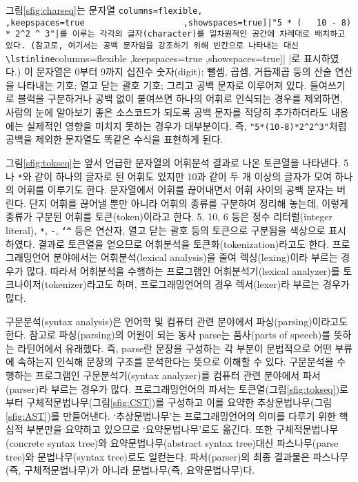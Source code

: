 그림\;\ref{sfig:charseq}는 문자열
\lstinline[columns=flexible,
                   ,keepspaces=true
                   ,showspaces=true]|"5 * (   10 - 8) * 2^2 ^ 3"|를
이루는 각각의 글자(character)를 일차원적인 공간에 차례대로 배치하고 있다.
(참고로, 여기서는 공백 문자임을 강조하기 위해 빈칸으로 나타내는 대신
\lstinline[columns=flexible
                   ,keepspaces=true
                   ,showspaces=true]| |로 표시하였다.)
이 문자열은 0부터 9까지 십진수 숫자(digit); 뺄셈, 곱셈, 거듭제곱 등의
산술 연산을 나타내는 기호; 열고 닫는 괄호 기호; 그리고 공백 문자로
이루어져 있다. 들여쓰기로 블럭을 구분하거나 공백 없이 붙여쓰면 하나의
어휘로 인식되는 경우를 제외하면, 사람의 눈에 알아보기 좋은 소스코드가
되도록 공백 문자를 적당히 추가하더라도 내용에는 실제적인 영향을
미치지 못하는 경우가 대부분이다. 즉,
\lstinline[columns=flexible
                   ,keepspaces=true
                   ,showspaces=true]|"5*(10-8)*2^2^3"|처럼
공백을 제외한 문자열도 똑같은 수식을 표현하게 된다.

그림\;\ref{sfig:tokseq}는 앞서 언급한 문자열의 어휘분석 결과로 나온
토큰열을 나타낸다. 5나 \texttt{*}와 같이 하나의 글자로 된 어휘도 있지만
10과 같이 두 개 이상의 글자가 모여 하나의 어휘를 이루기도 한다.
문자열에서 어휘를 끊어내면서 어휘 사이의 공백 문자는 버린다.
단지 어휘를 끊어낼 뿐만 아니라 어휘의 종류를 구분하여 정리해 놓는데,
이렇게 종류가 구분된 어휘를 토큰(token)이라고 한다.
5, 10, 6 등은 정수 리터럴(integer literal),
\texttt{*}, \texttt{-}, \texttt{\textbf{\char`^}} 등은 연산자,
열고 닫는 괄호 등의 토큰으로 구분됨을 색상으로 표시하였다.
결과로 토큰열을 얻으므로 어휘분석을 토큰화(tokenization)라고도 한다.
프로그래밍언어 분야에서는 어휘분석(lexical analysis)을 줄여
렉싱(lexing)이라 부르는 경우가 많다. 따라서 어휘분석을 수행하는
프로그램인 어휘분석기(lexical analyzer)를 토크나이저(tokenizer)라고도 하며,
프로그래밍언어의 경우 렉서(lexer)라 부르는 경우가 많다.

구문분석(syntax analysis)은 언어학 및 컴퓨터 관련 분야에서
파싱(parsing)이라고도 한다. 참고로 파싱(parsing)의 어원이 되는 동사
parse는 품사(parts of speech)를 뜻하는 라틴어에서 유래했다\cite{MWdict}.
즉, parse란 문장을 구성하는 각 부분이 문법적으로 어떤 부류에
속하는지 인식해 문장의 구조를 분석한다는 뜻으로 이해할 수 있다.
구문분석을 수행하는 프로그램인 구문분석기(syntax analyzer)를
컴퓨터 관련 분야에서 파서(parser)라 부르는 경우가 많다.
프로그래밍언어의 파서는 토큰열(그림\;\ref{sfig:tokseq})로부터
구체적문법나무(그림\;\ref{sfig:CST})를 구성하고 이를 요약한
추상문법나무(그림\;\ref{sfig:AST})를 만들어낸다. `추상문법나무'는
프로그래밍언어의 의미를 다루기 위한 핵심적 부분만을 요약하고 있으므로
`요약문법나무'로도 옮긴다. 또한 구체적문법나무(concrete syntax tree)와
요약문법나무(abstract syntax tree)대신 파스나무(parse tree)와
문법나무(syntax tree)로도 일컫는다. 파서(parser)의 최종 결과물은
파스나무(즉, 구체적문법나무)가 아니라 문법나무(즉, 요약문법나무)다.

